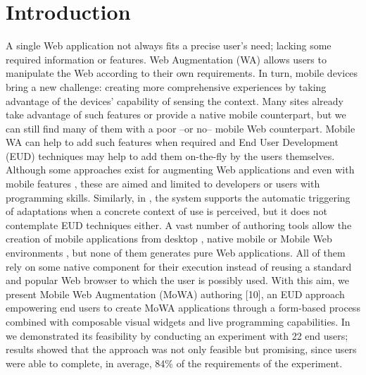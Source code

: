 \documentclass[runningheads]{llncs}
\begin{document}
\section{Introduction}
 A single Web application not always fits a precise user’s need; lacking some required information or features. Web Augmentation (WA) \cite{ref1} allows users to manipulate the Web according to their own requirements. In turn, mobile devices bring a new challenge: creating more comprehensive experiences by taking advantage of the devices’ capability of sensing the context. Many sites already take advantage of such features or provide a native mobile counterpart, but we can still find many of them with a poor –or no– mobile Web counterpart. Mobile WA can help to add such features when required and End User Development (EUD) \cite{ref2} techniques may help to add them on-the-fly by the users themselves.  Although some approaches exist for augmenting Web applications \cite{ref3} and even with mobile features \cite{ref4,ref5}, these are aimed and limited to developers or users with programming skills. Similarly, in \cite{ref6}, the system supports the automatic triggering of adaptations when a concrete context of use is perceived, but it does not contemplate EUD techniques either. A vast number of authoring tools allow the creation of mobile applications from desktop \cite{ref7}, native mobile \cite{ref8} or Mobile Web environments \cite{ref9}, but none of them generates pure Web applications. All of them rely on some native component for their execution instead of reusing a standard and popular Web browser to which the user is possibly used.  With this aim, we present Mobile Web Augmentation (MoWA) authoring [10], an EUD approach empowering end users to create MoWA applications through a form-based process combined with composable visual widgets and live programming capabilities. In \cite{ref10} we demonstrated its feasibility by conducting an experiment with 22 end users; results showed that the approach was not only feasible but promising, since users were able to complete, in average, 84\% of the requirements of the experiment.
\end{document}

